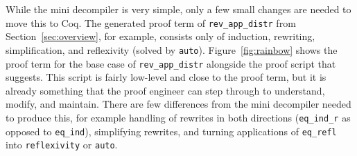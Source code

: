 \iffalse
\begin{figure*}
\begin{minipage}{0.48\textwidth}
\begin{lstlisting}
fun (@\codesimb{(y0 : list A)}@) =>(@\vspace{-0.04cm}@)
  (@\codesima{list_rect}@) _ _  (fun (@\codesima{a l H}@) =>(@\vspace{-0.04cm}@)
    (@\codesimc{eq_ind_r}@) _ (@\codesimd{eq_refl}@) (@\codesimc{(app_nil_r (rev l) (a::[]))}@))(@\vspace{-0.04cm}@)
    (@\codesime{eq_refl}@)(@\vspace{-0.04cm}@)
    (@\codesima{y0}@)(@\vspace{-0.04cm}@)
\end{lstlisting}
\end{minipage}
\begin{minipage}{0.48\textwidth}
\begin{lstlisting}
(@\vspace{-0.14cm}@)
- (@\codesimb{intro y0.}@) (@\codesima{induction y0 as [a l H|]}.@)(@\vspace{-0.04cm}@)
  + (@\codesimc{simpl. rewrite app_nil_r.}@) (@\codesimd{auto.}@)(@\vspace{-0.04cm}@)
  + (@\codesime{auto.}@)(@\vspace{-0.04cm}@)
(@\vspace{-0.14cm}@)
\end{lstlisting}
\end{minipage}
\vspace{-0.4cm}
\caption{Proof term (left) and decompiled proof script (right) for the base case of 
\lstinline{rev_app_distr} (Section~\ref{sec:overview}), with corresponding terms and tactics 
highlighted the same color.}
\label{fig:rainbow}
\end{figure*}
\fi

While the mini decompiler is very simple, only a few small changes are needed
to move this to Coq.
The generated proof term of \lstinline{rev_app_distr} from Section~\ref{sec:overview},
for example, consists only of induction, rewriting, simplification, and reflexivity (solved by \lstinline{auto}).
Figure~\ref{fig:rainbow} shows the proof term for the base case of \lstinline{rev_app_distr} 
alongside the proof script that \toolname suggests.
This script is fairly low-level and close to the proof term, but it is already something that the proof engineer
can step through to understand, modify, and maintain.
There are few differences from the mini decompiler needed to produce this,
for example handling of rewrites in both directions (\lstinline{eq_ind_r} as opposed to \lstinline{eq_ind}),
simplifying rewrites,
and turning applications of \lstinline{eq_refl} into \lstinline{reflexivity} or \lstinline{auto}.

